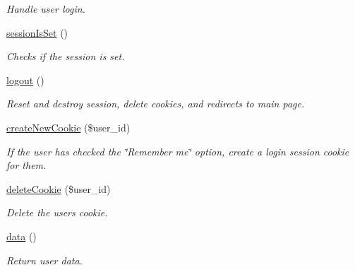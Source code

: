 \begin{DoxyCompactItemize}
\begin{DoxyCompactList}\small\item\em Handle user login. \end{DoxyCompactList}\item 
\hypertarget{classMember_a1ebfbff8b4159700fd6ba42d3abffa41}{\hyperlink{classMember_a1ebfbff8b4159700fd6ba42d3abffa41}{session\-Is\-Set} ()}\label{classMember_a1ebfbff8b4159700fd6ba42d3abffa41}

\begin{DoxyCompactList}\small\item\em Checks if the session is set. \end{DoxyCompactList}\item 
\hypertarget{classMember_a9d15d39e7d2e9417086f08fd8d2ba52e}{\hyperlink{classMember_a9d15d39e7d2e9417086f08fd8d2ba52e}{logout} ()}\label{classMember_a9d15d39e7d2e9417086f08fd8d2ba52e}

\begin{DoxyCompactList}\small\item\em Reset and destroy session, delete cookies, and redirects to main page. \end{DoxyCompactList}\item 
\hyperlink{classMember_aec76f4eeb51b0a6678305e71ca90f9d4}{create\-New\-Cookie} (\$user\-\_\-id)
\begin{DoxyCompactList}\small\item\em If the user has checked the \char`\"{}\-Remember me\char`\"{} option, create a login session cookie for them. \end{DoxyCompactList}\item 
\hyperlink{classMember_ac2dcb4c19a67fe43eb5806105401bfed}{delete\-Cookie} (\$user\-\_\-id)
\begin{DoxyCompactList}\small\item\em Delete the users cookie. \end{DoxyCompactList}\item 
\hypertarget{classMember_a9efd5a33fc7ecde58c4869061ab4e3df}{\hyperlink{classMember_a9efd5a33fc7ecde58c4869061ab4e3df}{data} ()}\label{classMember_a9efd5a33fc7ecde58c4869061ab4e3df}

\begin{DoxyCompactList}\small\item\em Return user data. \end{DoxyCompactList}\end{DoxyCompactItemize}
